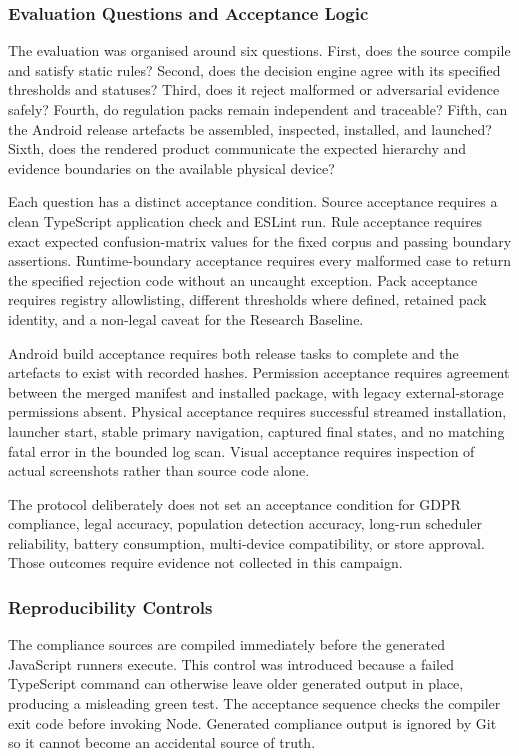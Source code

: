 \subsubsection{Evaluation Questions and Acceptance Logic}

The evaluation was organised around six questions. First, does the source compile and satisfy static rules? Second, does the decision engine agree with its specified thresholds and statuses? Third, does it reject malformed or adversarial evidence safely? Fourth, do regulation packs remain independent and traceable? Fifth, can the Android release artefacts be assembled, inspected, installed, and launched? Sixth, does the rendered product communicate the expected hierarchy and evidence boundaries on the available physical device?

Each question has a distinct acceptance condition. Source acceptance requires a clean TypeScript application check and ESLint run. Rule acceptance requires exact expected confusion-matrix values for the fixed corpus and passing boundary assertions. Runtime-boundary acceptance requires every malformed case to return the specified rejection code without an uncaught exception. Pack acceptance requires registry allowlisting, different thresholds where defined, retained pack identity, and a non-legal caveat for the Research Baseline.

Android build acceptance requires both release tasks to complete and the artefacts to exist with recorded hashes. Permission acceptance requires agreement between the merged manifest and installed package, with legacy external-storage permissions absent. Physical acceptance requires successful streamed installation, launcher start, stable primary navigation, captured final states, and no matching fatal error in the bounded log scan. Visual acceptance requires inspection of actual screenshots rather than source code alone.

The protocol deliberately does not set an acceptance condition for GDPR compliance, legal accuracy, population detection accuracy, long-run scheduler reliability, battery consumption, multi-device compatibility, or store approval. Those outcomes require evidence not collected in this campaign.

\subsubsection{Reproducibility Controls}

The compliance sources are compiled immediately before the generated JavaScript runners execute. This control was introduced because a failed TypeScript command can otherwise leave older generated output in place, producing a misleading green test. The acceptance sequence checks the compiler exit code before invoking Node. Generated compliance output is ignored by Git so it cannot become an accidental source of truth.

